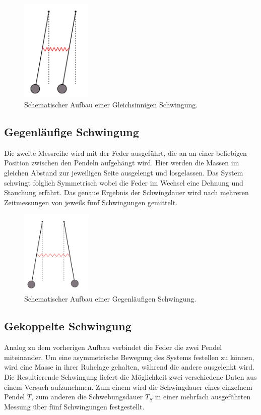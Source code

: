 \begin{figure}
    \centering
    \includegraphics[width=0.3\textwidth]{bilder/gleich.png}
    \caption{Schematischer Aufbau einer Gleichsinnigen Schwingung. \cite{skript}} 
    \label{fig:1}
\end{figure}

\subsection{Gegenläufige Schwingung}
Die zweite Messreihe wird mit der Feder ausgeführt, die an an einer beliebigen Position zwischen den Pendeln aufgehängt wird.
Hier werden die Massen im gleichen Abstand zur jeweiligen Seite ausgelengt und losgelassen. Das System schwingt
folglich Symmetrisch wobei die Feder im Wechsel eine Dehnung und Stauchung erfährt.
Das genaue Ergebnis der Schwingdauer wird nach mehreren Zeitmessungen von jeweils fünf Schwingungen gemittelt.

\begin{figure}[h!]
    \centering
    \includegraphics[width=0.3\textwidth]{bilder/gegen.png}
    \caption{Schematischer Aufbau einer Gegenläufigen Schwingung. \cite{skript}} 
    \label{fig:2}
\end{figure}

\subsection{Gekoppelte Schwingung}
Analog zu dem vorherigen Aufbau verbindet die Feder die zwei Pendel miteinander. Um eine asymmetrische Bewegung des Systems 
festellen zu können, wird eine Masse in ihrer Ruhelage gehalten, während die andere ausgelenkt wird.
Die Resultierende Schwingung liefert die Möglichkeit zwei verschiedene Daten aus einem Versuch aufzunehmen.
Zum einem wird die Schwingdauer eines einzelnem Pendel $T$, zum anderen die Schwebungsdauer $T_S$ in einer 
mehrfach ausgeführten Messung über fünf Schwingungen festgestellt.

